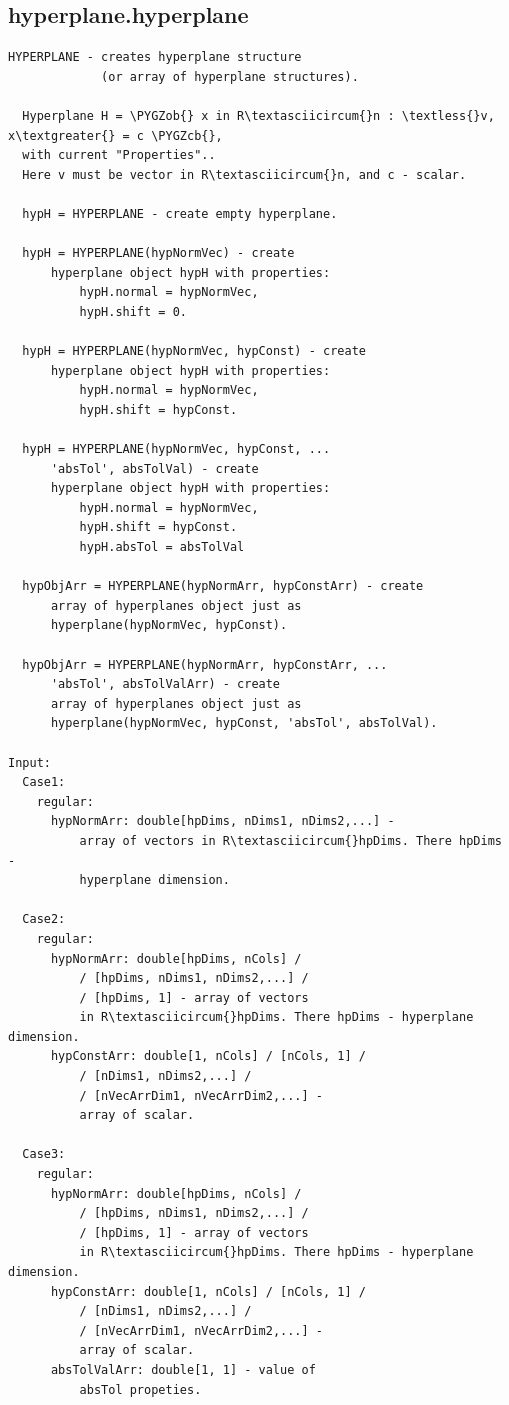 \documentclass[letterpaper,10pt,english]{sphinxmanual}
\def\PYGZob{\char`\{}
\def\PYGZcb{\char`\}}
\begin{document}
\subsection{hyperplane.hyperplane}
\label{chap_functions:hyperplane-hyperplane}
\begin{Verbatim}[commandchars=\\\{\}]
HYPERPLANE - creates hyperplane structure
             (or array of hyperplane structures).

  Hyperplane H = \PYGZob{} x in R\textasciicircum{}n : \textless{}v, x\textgreater{} = c \PYGZcb{},
  with current "Properties"..
  Here v must be vector in R\textasciicircum{}n, and c - scalar.

  hypH = HYPERPLANE - create empty hyperplane.

  hypH = HYPERPLANE(hypNormVec) - create
      hyperplane object hypH with properties:
          hypH.normal = hypNormVec,
          hypH.shift = 0.

  hypH = HYPERPLANE(hypNormVec, hypConst) - create
      hyperplane object hypH with properties:
          hypH.normal = hypNormVec,
          hypH.shift = hypConst.

  hypH = HYPERPLANE(hypNormVec, hypConst, ...
      'absTol', absTolVal) - create
      hyperplane object hypH with properties:
          hypH.normal = hypNormVec,
          hypH.shift = hypConst.
          hypH.absTol = absTolVal

  hypObjArr = HYPERPLANE(hypNormArr, hypConstArr) - create
      array of hyperplanes object just as
      hyperplane(hypNormVec, hypConst).

  hypObjArr = HYPERPLANE(hypNormArr, hypConstArr, ...
      'absTol', absTolValArr) - create
      array of hyperplanes object just as
      hyperplane(hypNormVec, hypConst, 'absTol', absTolVal).

Input:
  Case1:
    regular:
      hypNormArr: double[hpDims, nDims1, nDims2,...] -
          array of vectors in R\textasciicircum{}hpDims. There hpDims -
          hyperplane dimension.

  Case2:
    regular:
      hypNormArr: double[hpDims, nCols] /
          / [hpDims, nDims1, nDims2,...] /
          / [hpDims, 1] - array of vectors
          in R\textasciicircum{}hpDims. There hpDims - hyperplane dimension.
      hypConstArr: double[1, nCols] / [nCols, 1] /
          / [nDims1, nDims2,...] /
          / [nVecArrDim1, nVecArrDim2,...] -
          array of scalar.

  Case3:
    regular:
      hypNormArr: double[hpDims, nCols] /
          / [hpDims, nDims1, nDims2,...] /
          / [hpDims, 1] - array of vectors
          in R\textasciicircum{}hpDims. There hpDims - hyperplane dimension.
      hypConstArr: double[1, nCols] / [nCols, 1] /
          / [nDims1, nDims2,...] /
          / [nVecArrDim1, nVecArrDim2,...] -
          array of scalar.
      absTolValArr: double[1, 1] - value of
          absTol propeties.


\end{Verbatim}
\end{document}

